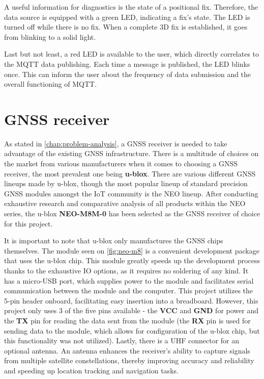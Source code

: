\documentclass[FM,BP,EN,fonts]{tulthesis}
\begin{document}
A useful information for diagnostics is the state of a positional fix. Therefore, the data source is equipped with a green LED, indicating a fix's state. The LED is turned off while there is no fix. When a complete 3D fix is established, it goes from blinking to a solid light.

Last but not least, a red LED is available to the user, which directly correlates to the MQTT data publishing. Each time a message is published, the LED blinks once. This can inform the user about the frequency of data submission and the overall functioning of MQTT.


\section{GNSS receiver} 
As stated in \autoref{chap:problem-analysis}, a GNSS receiver is needed to take advantage of the existing GNSS infrastructure. There is a multitude of choices on the market from various manufacturers when it comes to choosing a GNSS receiver, the most prevalent one being \textbf{u-blox}. There are various different GNSS lineups made by u-blox, though the most popular lineup of standard precision GNSS modules amongst the IoT community is the NEO lineup. After conducting exhaustive research and comparative analysis of all products within the NEO series, the u-blox \textbf{NEO-M8M-0} has been selected as the GNSS receiver of choice for this project.

It is important to note that u-blox only manufactures the GNSS chips themselves. The module seen on \autoref{fig:neo-m8} is a convenient development package that uses the u-blox chip. This module greatly speeds up the development process thanks to the exhaustive IO options, as it requires no soldering of any kind. It has a micro-USB port, which supplies power to the module and facilitates serial communication between the module and the computer. This project utilizes the 5-pin header onboard, facilitating easy insertion into a breadboard. However, this project only uses 3 of the five pins available - the \textbf{VCC} and \textbf{GND} for power and the \textbf{TX} pin for reading the data sent from the module (the \textbf{RX} pin is used for sending data to the module, which allows for configuration of the u-blox chip, but this functionality was not utilized). Lastly, there is a UHF connector for an optional antenna. An antenna enhances the receiver's ability to capture signals from multiple satellite constellations, thereby improving accuracy and reliability and speeding up location tracking and navigation tasks.
\end{document}
